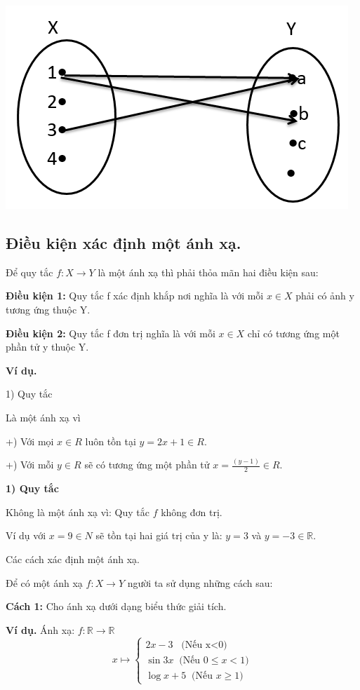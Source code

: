 \documentclass[12pt,oneside,a4paper,reqno]{book}
\begin{document}
\includegraphics{hinh2}
\subsection{	Điều kiện xác định một ánh xạ.}
Để quy tắc $f:X\to Y$ là một ánh xạ thì phải thỏa mãn hai điều kiện sau:

\textbf{Điều kiện 1:} Quy tắc f xác định khắp nơi nghĩa là với mỗi $x\in X$ phải có ảnh y tương ứng thuộc Y.

\textbf{Điều kiện 2: } Quy tắc f đơn trị nghĩa là với mỗi $x\in X$ chỉ có tương ứng một phần tử y thuộc Y.

\textbf{Ví dụ.}

1) Quy tắc 

\centerline{}


Là một ánh xạ vì 

+)  Với mọi $x\in R$  luôn tồn tại $y=2x+1 \in R.$

+)  Với mỗi $y\in R$ sẽ có tương ứng một phần tử $x=\frac{(y-1)}{2} \in R.$

\textbf{1) Quy tắc }

\centerline{}


Không là một ánh xạ vì: Quy tắc $f$ không đơn trị.

Ví dụ với $x=9\in N$ sẽ tồn tại hai giá trị của y là: $y=3$ và $y=-3\in \mathbb{R}.$

Các cách xác định một ánh xạ.

Để có một ánh xạ $f:X\to Y$ người ta sử dụng những cách sau:

\textbf{Cách 1: }Cho ánh xạ dưới dạng biểu thức giải tích.

\textbf{Ví dụ.}
Ánh xạ: $f:\mathbb{R}\to \mathbb{R}$
\[x \mapsto \left\{ \begin{array}{l}
2x - 3\;\;\;\text{(Nếu x<0)}\\
\sin 3x \;\; \text{(Nếu } 0\le x <1 )\\
\log x + 5 \;\; \text{(Nếu } x\ge 1)
\end{array} \right.\]
\end{document}
